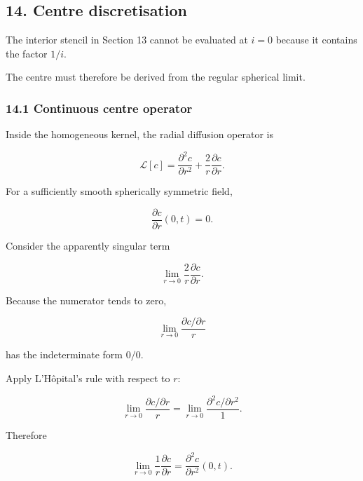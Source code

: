 \documentclass[11pt,a4paper]{article}
\begin{document}
\subsection*{14. Centre discretisation}

The interior stencil in Section 13 cannot be evaluated at $i=0$ because it contains the factor $1/i$.

The centre must therefore be derived from the regular spherical limit.

\subsubsection*{14.1 Continuous centre operator}

Inside the homogeneous kernel, the radial diffusion operator is

\begin{equation}
\mathcal L[c]
=
\frac{\partial^2c}{\partial r^2}
+
\frac2r\frac{\partial c}{\partial r}.
\tag{TRISO-DIS-200}
\label{eq:triso-dis-200}
\end{equation}

For a sufficiently smooth spherically symmetric field,

\begin{equation}
\frac{\partial c}{\partial r}(0,t)=0.
\tag{TRISO-DIS-201}
\label{eq:triso-dis-201}
\end{equation}

Consider the apparently singular term

\begin{equation}
\lim_{r\to0}
\frac2r
\frac{\partial c}{\partial r}.
\tag{TRISO-DIS-202}
\label{eq:triso-dis-202}
\end{equation}

Because the numerator tends to zero,

\begin{equation}
\lim_{r\to0}
\frac{\partial c/\partial r}{r}
\end{equation}

has the indeterminate form $0/0$.

Apply L'Hôpital's rule with respect to $r$:

\begin{equation}
\lim_{r\to0}
\frac{\partial c/\partial r}{r}
=
\lim_{r\to0}
\frac{\partial^2c/\partial r^2}{1}.
\tag{TRISO-DIS-203}
\label{eq:triso-dis-203}
\end{equation}

Therefore

\begin{equation}
\lim_{r\to0}
\frac1r
\frac{\partial c}{\partial r}
=
\frac{\partial^2c}{\partial r^2}(0,t).
\tag{TRISO-DIS-204}
\label{eq:triso-dis-204}
\end{equation}
\end{document}

